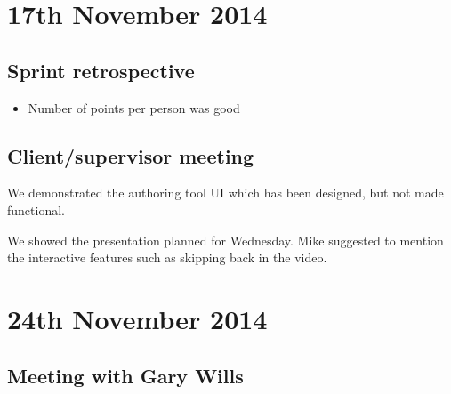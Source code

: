 \section{17th November 2014}\label{Minutes:2014-11-17}

\subsection{Sprint retrospective}

\begin{itemize}
\itemsep1pt\parskip0pt
\item
  Number of points per person was good
\end{itemize}

\subsection{Client/supervisor meeting}

We demonstrated the authoring tool UI which has been designed, but not
made functional.

We showed the presentation planned for Wednesday. Mike suggested to
mention the interactive features such as skipping back in the video.

\section{24th November 2014}\label{Minutes:2014-11-24}

\subsection{Meeting with Gary Wills}

